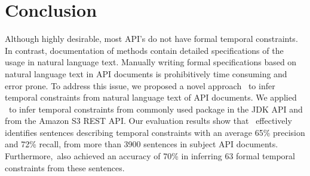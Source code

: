 \section{Conclusion}
\label{sec:conclusion}

Although highly desirable, most API's do not have formal temporal constraints.
In contrast, documentation of methods contain detailed specifications of the usage in natural language text.
Manually writing formal specifications based on natural language text in API documents is prohibitively time consuming and error prone.
To address this issue, we proposed a novel approach \tool\ to infer temporal constraints from natural language text of API documents.
We applied \tool\ to infer temporal constraints from 
commonly used package  in the JDK API and from the Amazon S3 REST API.
Our evaluation results show that \tool\ effectively identifies sentences describing
temporal constraints with an average 65\% precision and 72\% recall,
from more than 3900 sentences in subject API documents.
Furthermore,\tool\ also achieved an  accuracy of
70\% in inferring 63 formal temporal constraints from these sentences.
